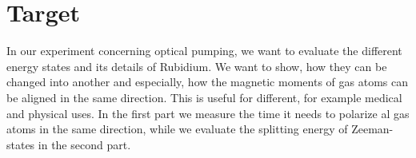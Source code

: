 \section{Target}
In our experiment concerning optical pumping, we want to evaluate the different energy states and its details of Rubidium. We want to show, how they can be changed into another and especially, how the magnetic moments of gas atoms can be aligned in the same direction. This is useful for different, for example medical and physical uses. In the first part we measure the time it needs to polarize al gas atoms in the same direction, while we evaluate the splitting energy of Zeeman-states in the second part.

